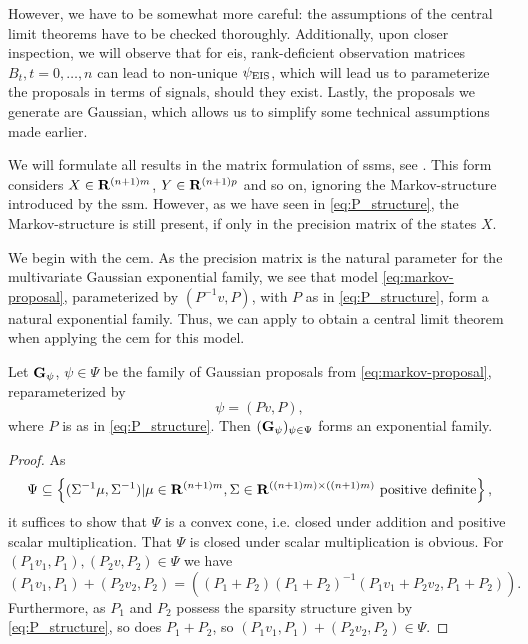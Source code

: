 However, we have to be somewhat more careful: the assumptions of the central limit theorems have to be checked thoroughly. Additionally, upon closer inspection, we will observe that for \gls{eis}, rank-deficient observation matrices $B_{t}, t=0,\dots,n$ can lead to non-unique $\psi_{{\text{EIS}}}$, which will lead us to parameterize the proposals in terms of signals, should they exist. Lastly, the proposals we generate are Gaussian, which allows us to simplify some technical assumptions made earlier.

We will formulate all results in the matrix formulation of \glspl{ssm}, see \citep[Section 4.13]{Durbin2012Time}. This form considers $X\in\mathbf R^{(n+1)m}$, $Y\in\mathbf R^{(n+1)p}$ and so on, ignoring the Markov-structure introduced by the \gls{ssm}. However, as we have seen in \eqref{eq:P_structure}, the Markov-structure is still present, if only in the precision matrix of the states $X$. 

We begin with the \gls{cem}. As the precision matrix is the natural parameter for the multivariate Gaussian exponential family, we see that model \eqref{eq:markov-proposal}, parameterized by $(P^{-1}v, P)$, with $P$ as in \eqref{eq:P_structure}, form a natural exponential family. Thus, we can apply  to obtain a central limit theorem when applying the \gls{cem} for this model. 

\begin{lemma}
    \label{lem:markov_proposal_exponential_family}
    Let $\mathbf G_{\psi}$, $\psi \in \Psi$ be the family of Gaussian proposals from \eqref{eq:markov-proposal}, reparameterized by 
    $$
        \psi = \left( Pv, P \right),
    $$
    where $P$ is as in \eqref{eq:P_structure}. Then $(\mathbf G_{\psi})_{\psi \in \Psi}$ forms an exponential family.
\end{lemma}

\begin{proof}
    As 
    $$\Psi \subseteq \left\{(\Sigma ^{-1} \mu, \Sigma^{-1}) | \mu \in \mathbf R^{(n+1)m}, \Sigma \in \mathbf R^{((n+1)m)\times ((n+1)m)}\text{ positive definite}\right\},$$
    it suffices to show that $\Psi$ is a convex cone, i.e. closed under addition and positive scalar multiplication. That $\Psi$ is closed under scalar multiplication is obvious. For $(P_{1}v_{1}, P_{1}), (P_{2}v, P_{2}) \in \Psi$ we have 
    $$
        (P_1v_{1}, P_{1}) + (P_2v_{2}, P_{2}) = \left( (P_{1} + P_{2}) (P_{1} + P_{2})^{-1} (P_{1}v_{1} + P_{2}v_{2}, P_{1} + P_{2})\right).
    $$
    Furthermore, as $P_{1}$ and $P_{2}$ possess the sparsity structure given by \eqref{eq:P_structure}, so does $P_{1} + P_{2}$, so $(P_1v_{1}, P_{1}) + (P_2v_{2}, P_{2}) \in \Psi$.
\end{proof}


